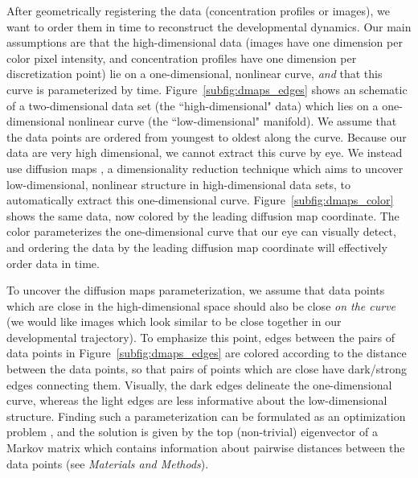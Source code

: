 \documentclass{pnastwo}
\begin{document}
\begin{article}
After geometrically registering the data (concentration profiles or images), we want to order them in time to reconstruct the developmental dynamics.
%
%
Our main assumptions are that the high-dimensional data (images have one dimension per color pixel intensity, and concentration profiles have one dimension per discretization point) lie on a one-dimensional, nonlinear curve, {\em and} that this curve is parameterized by time.
%
Figure~\ref{subfig:dmaps_edges} shows an schematic of a two-dimensional data set (the ``high-dimensional" data) which lies on a one-dimensional nonlinear curve (the ``low-dimensional" manifold).
%
We assume that the data points are ordered from youngest to oldest along the curve.
%
Because our data are very high dimensional, we cannot extract this curve by eye.
%
We instead use diffusion maps \cite{coifman2005geometric}, a dimensionality reduction technique which aims to uncover low-dimensional, nonlinear structure in high-dimensional data sets, to automatically extract this one-dimensional curve.
%
Figure~\ref{subfig:dmaps_color} shows the same data, now colored by the leading diffusion map coordinate.
%
The color parameterizes the one-dimensional curve that our eye can visually detect, and ordering the data by the leading diffusion map coordinate will effectively order data in time.

To uncover the diffusion maps parameterization, we assume that data points which are close in the high-dimensional space should also be close {\em on the curve} (we would like images which look similar to be close together in our developmental trajectory).
%
%
To emphasize this point, edges between the pairs of data points in Figure~\ref{subfig:dmaps_edges} are colored according to the distance between the data points, so that pairs of points which are close have dark/strong edges connecting them.
%
Visually, the dark edges delineate the one-dimensional curve, whereas the light edges are less informative about the low-dimensional structure.
%
%
Finding such a parameterization can be formulated as an optimization problem \cite{Belkin2003}, and the solution is given by the top (non-trivial) eigenvector of a Markov matrix which contains information about pairwise distances between the data points (see {\it Materials and Methods}).
%
%


\end{article}
\end{document}
